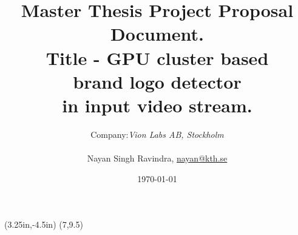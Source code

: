 \documentclass[12pt]{article}
\title{Master Thesis Project Proposal Document. \\ 
	Title - GPU cluster based \\ brand logo detector \\ in input video stream.}
\author{ Company:{\it  Vion Labs AB, Stockholm} 
	    \\\\Nayan Singh Ravindra, \hyperlink{mailto:nayan@kth.se}{nayan@kth.se}}
\date{\today}
\begin{document}
\thisfancyput(3.25in,-4.5in){%
	\setlength{\unitlength}{1in}\fancyoval(7,9.5)}%
	
	\maketitle
	\pagebreak
	\tableofcontents
	
	\printglossaries
	\printbibliography	
\end{document}
